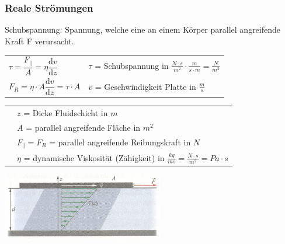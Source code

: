 		\subsubsection{Reale Strömungen}
			\begin{minipage}{12cm}
				\begin{flushleft}
					Schubspannung: Spannung, welche eine an einem Körper parallel angreifende Kraft F verursacht.
				\end{flushleft}
				\renewcommand{\arraystretch}{2.5}
				\begin{tabular}{ p{4cm} | p{7cm}}
					$\tau = \dfrac{F_\parallel}{A} = \eta \dfrac{\mathrm{d}v}{\mathrm{d}z}$	&	$\tau$ = Schubspannung in $\frac{N \cdot s}{m^2} \cdot \frac{m}{s \cdot m} = \frac{N}{m^2}$\\
					$F_R = \eta \cdot A \dfrac{\mathrm{d}v}{\mathrm{d}z} = \tau \cdot A$ & $v$ = Geschwindigkeit Platte in $\frac{m}{s}$\\
				\end{tabular}
				\renewcommand{\arraystretch}{1.5}
				\begin{tabular}{ p{4cm} | p{10cm} }
					& $z$ = Dicke Fluidschicht in $m$\\
					& $A$ = parallel angreifende Fläche in $m^2$\\
					& $F_{\parallel} = F_R$ = parallel angreifende Reibungskraft in $N$\\
					& $\eta$ = dynamische Viskosität (Zähigkeit) in $\frac{kg}{ms} = \frac{N \cdot s}{m^2} = Pa \cdot s$\\
				\end{tabular} 
				\renewcommand{\arraystretch}{1}
			\end{minipage}
			\begin{minipage}{10cm}
				\vspace{-\ht\strutbox}\includegraphics[width=7cm]{./bilder/NewtonschesReibungsgesetz.png}
			\end{minipage}
			\newline
			\newline
			\newline
			\newline
